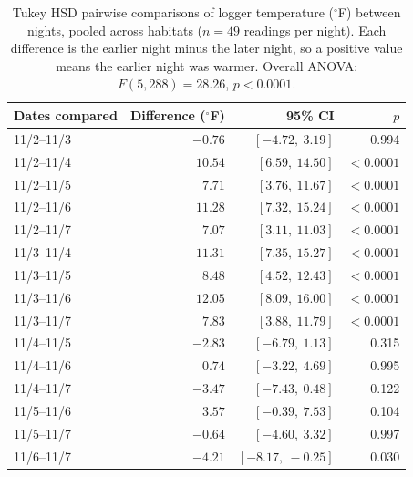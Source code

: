 \documentclass[10pt]{article}
\begin{document}
\begin{table}[H]
\centering
\caption{Tukey HSD pairwise comparisons of logger temperature ($^{\circ}$F) between nights, pooled across habitats ($n = 49$ readings per night). Each difference is the earlier night minus the later night, so a positive value means the earlier night was warmer. Overall ANOVA: $F(5, 288) = 28.26$, $p < 0.0001$.}
\label{tab:tukey_temp}
\begin{tabular}{@{}lrrr@{}}
\toprule
Dates compared & Difference ($^{\circ}$F) & 95\% CI & $p$ \\
\midrule
11/2--11/3 & $-0.76$ & $[-4.72,\ 3.19]$ & 0.994 \\
11/2--11/4 & $10.54$ & $[6.59,\ 14.50]$ & $<0.0001$ \\
11/2--11/5 & $7.71$ & $[3.76,\ 11.67]$ & $<0.0001$ \\
11/2--11/6 & $11.28$ & $[7.32,\ 15.24]$ & $<0.0001$ \\
11/2--11/7 & $7.07$ & $[3.11,\ 11.03]$ & $<0.0001$ \\
11/3--11/4 & $11.31$ & $[7.35,\ 15.27]$ & $<0.0001$ \\
11/3--11/5 & $8.48$ & $[4.52,\ 12.43]$ & $<0.0001$ \\
11/3--11/6 & $12.05$ & $[8.09,\ 16.00]$ & $<0.0001$ \\
11/3--11/7 & $7.83$ & $[3.88,\ 11.79]$ & $<0.0001$ \\
11/4--11/5 & $-2.83$ & $[-6.79,\ 1.13]$ & 0.315 \\
11/4--11/6 & $0.74$ & $[-3.22,\ 4.69]$ & 0.995 \\
11/4--11/7 & $-3.47$ & $[-7.43,\ 0.48]$ & 0.122 \\
11/5--11/6 & $3.57$ & $[-0.39,\ 7.53]$ & 0.104 \\
11/5--11/7 & $-0.64$ & $[-4.60,\ 3.32]$ & 0.997 \\
11/6--11/7 & $-4.21$ & $[-8.17,\ -0.25]$ & 0.030 \\
\bottomrule
\end{tabular}
\end{table}
\end{document}

